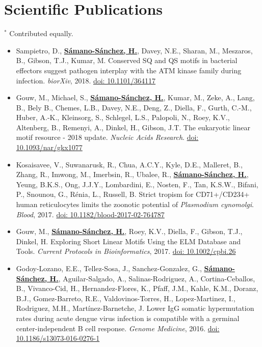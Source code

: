 \documentclass[11pt,a4paper,sans]{moderncv} %
\begin{document}
\section{Scientific Publications}
\vspace{-.1cm}
\footnotesize{$^{\ast}$ Contributed equally.} \hspace{.5cm}
\vspace{.1cm}
\begin{itemize}
  \item Sampietro, D., \textbf{\underline{S\'amano-S\'anchez, H.}}, Davey, N.E., Sharan, M., Meszaros, B., Gibson, T.J., Kumar, M. Conserved SQ and QS motifs in bacterial effectors suggest pathogen interplay with the ATM kinase family during infection. \textit{biorXiv}, 2018. \href{https://doi.org/10.1101/364117}{doi: 10.1101/364117}
  \item Gouw, M., Michael, S., \textbf{\underline{S\'amano-S\'anchez, H.}}, Kumar, M., Zeke, A., Lang, B., Bely B., Chemes, L.B., Davey, N.E., Deng, Z., Diella, F., Gurth, C.-M., Huber, A.-K., Kleinsorg, S., Schlegel, L.S., Palopoli, N., Roey, K.V., Altenberg, B., Remenyi, A., Dinkel, H., Gibson, J.T. The eukaryotic linear motif resource - 2018 update. \textit{Nucleic Acids Research}. \href{https://doi.org/10.1093/nar/gkx1077}{doi: 10.1093/nar/gkx1077}
  \item Kosaisavee, V., Suwanarusk, R., Chua, A.C.Y., Kyle, D.E., Malleret, B., Zhang, R., Imwong, M., Imerbsin, R., Ubalee, R., \textbf{\underline{S\'amano-S\'anchez, H.}}, Yeung, B.K.S., Ong, J.J.Y., Lombardini, E., Nosten, F., Tan, K.S.W., Bifani, P., Snounou, G., R\'enia, L., Russell, B. Strict tropism for CD71+/CD234+ human reticulocytes limits the zoonotic potential of \textit{Plasmodium cynomolgi}. \textit{Blood}, 2017. \href{https://doi.org/10.1182/blood-2017-02-764787}{doi: 10.1182/blood-2017-02-764787}
  \item Gouw, M., \textbf{\underline{S\'amano-S\'anchez, H.}}, Roey, K.V., Diella, F., Gibson, T.J., Dinkel, H. Exploring Short Linear Motifs Using the ELM Database and Tools. \textit{Current Protocols in Bioinformatics}, 2017. \href{https://doi.org/10.1002/cpbi.26}{doi: 10.1002/cpbi.26}
  \item Godoy-Lozano, E.E., Tellez-Sosa, J., Sanchez-Gonzalez, G., \textbf{\underline{S\'amano-S\'anchez, H.}}, Aguilar-Salgado, A., Salinas-Rodriguez, A., Cortina-Ceballos, B., Vivanco-Cid, H., Hernandez-Flores, K., Pfaff, J.M., Kahle, K.M., Doranz, B.J., Gomez-Barreto, R.E., Valdovinos-Torres, H., Lopez-Martinez, I., Rodriguez, M.H., Mart\'inez-Barnetche, J. Lower IgG somatic hypermutation rates during acute dengue virus infection is compatible with a germinal center-independent B cell response. \textit{Genome Medicine}, 2016. \href{https://doi.org/10.1186/s13073-016-0276-1}{doi: 10.1186/s13073-016-0276-1}

\end{itemize}
\end{document}
